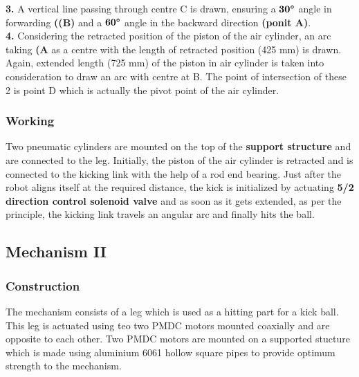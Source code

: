                 \textbf{3.} A vertical line passing through centre C is drawn, ensuring a $\textbf{30\degree}$ angle in forwarding \textbf{((B)} and
                            a $\textbf{60\degree}$ angle in the backward direction \textbf{(ponit A)}.                                                  \\    
                \textbf{4.} Considering the retracted position of the piston of the air cylinder, an arc taking \textbf{(A} as a centre with
                            the length of retracted position (425 mm) is drawn. Again, extended length (725 mm) of the piston in air cylinder
                            is taken into consideration to draw an arc with centre at B. The point of intersection of these 2 is point D which
                            is actually the pivot point of the air cylinder.                                                                            \\
    

        \subsubsection{Working}
            Two pneumatic cylinders are mounted on the top of the \textbf{support structure} and are connected to the leg. Initially, the 
            piston of the air cylinder is retracted and is connected to the kicking link with the help of a rod end bearing. Just after the robot
            aligns itself at the required distance, the kick is initialized by actuating \textbf{5/2 direction control solenoid valve} and as soon
            as it gets extended, as per the principle, the kicking link travels an angular arc and finally hits the ball.

    \subsection{Mechanism II}
    
        \subsubsection{Construction}
            The mechanism consists of a leg which is used as a hitting part for a kick ball. This leg is actuated using teo two PMDC motors mounted coaxially and are opposite to each other.
            Two PMDC motors are mounted on a supported stucture which is made using aluminium 6061 hollow square pipes to provide optimum strength to the mechanism.

